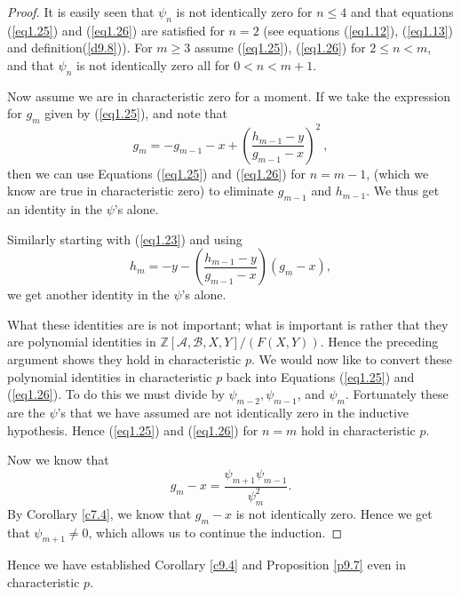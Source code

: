 \begin{proof}
It is easily seen that $\psi_{n}$ is not identically zero for $n\leq 4$ and that  equations (\ref{eq1.25}) and (\ref{eq1.26}) are satisfied for $n=2$ (see equations (\ref{eq1.12}), (\ref{eq1.13}) and definition(\ref{d9.8})). For $m\geq 3$ assume (\ref{eq1.25}), (\ref{eq1.26}) for $2 \leq n<m$, and that $\psi_{n}$ is not identically zero all for $0<n<m+1$.

Now assume we are in characteristic zero for a moment. If we take the expression for $g_{m}$ given by  (\ref{eq1.25}), and note that
\begin{equation*}
g_{m}=-g_{m-1}-x+\left(\frac{h_{m-1}-y}{g_{m-1}-x}\right)^{2}\ ,
\end{equation*}
then we can use Equations (\ref{eq1.25}) and (\ref{eq1.26}) for $n=m-1$, (which we know are true in characteristic zero) to eliminate $g_{m-1}$ and $h_{m-1}$. We thus get an identity in the $\psi$'s alone.

Similarly starting with (\ref{eq1.23}) and using
\begin{equation*}
h_{m}=-y-\left( \frac{h_{m-1}-y}{g_{m-1}-x}\right)(g_{m}-x) ,
\end{equation*}
we get another identity in the $\psi$'s alone.

What these identities are is not important; what is important is rather that they are polynomial identities in $\mathbb{Z}[\mathcal{A},\mathcal{B},X,Y]/(F(X,Y))$. Hence the preceding argument shows they hold in characteristic $p$. We would now like to convert these polynomial identities in characteristic $p$ back into Equations (\ref{eq1.25}) and (\ref{eq1.26}). To do this we must divide by $\psi_{m-2},\psi_{m-1}$, and $\psi_{m}$. Fortunately these are the $\psi$'s that we have assumed are not identically zero in the inductive hypothesis. Hence  (\ref{eq1.25}) and (\ref{eq1.26}) for $n=m$ hold in characteristic $p$.

Now we know that
\begin{equation}
\label{eq1.27}
g_{m}-x=\displaystyle \frac{\psi_{m+1}\psi_{m-1}}{\psi_{m}^{2}} .
\end{equation}
By Corollary \ref{c7.4}, we know that $g_{m}-x$ is not identically zero. Hence we get that $\psi_{m+1}\neq 0$, which allows us to continue the induction.
\end{proof}

Hence we have established Corollary \ref{c9.4} and Proposition \ref{p9.7} even in characteristic $p$.

